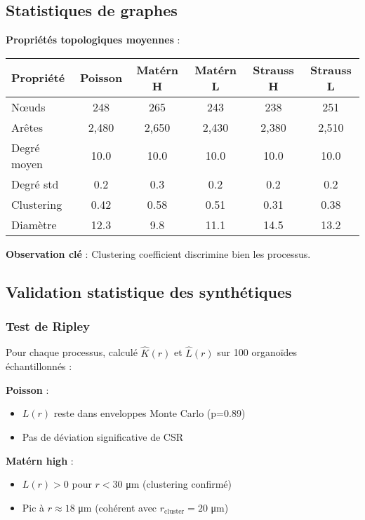 \subsection{Statistiques de graphes}

\textbf{Propriétés topologiques moyennes} :

\begin{tabular}{lccccc}
\hline
Propriété & Poisson & Matérn H & Matérn L & Strauss H & Strauss L \\
\hline
Nœuds & 248 & 265 & 243 & 238 & 251 \\
Arêtes & 2,480 & 2,650 & 2,430 & 2,380 & 2,510 \\
Degré moyen & 10.0 & 10.0 & 10.0 & 10.0 & 10.0 \\
Degré std & 0.2 & 0.3 & 0.2 & 0.2 & 0.2 \\
Clustering & 0.42 & 0.58 & 0.51 & 0.31 & 0.38 \\
Diamètre & 12.3 & 9.8 & 11.1 & 14.5 & 13.2 \\
\hline
\end{tabular}

\textbf{Observation clé} : Clustering coefficient discrimine bien les processus.

\subsection{Validation statistique des synthétiques}

\subsubsection{Test de Ripley}

Pour chaque processus, calculé $\hat{K}(r)$ et $\hat{L}(r)$ sur 100 organoïdes échantillonnés :

\textbf{Poisson} :
\begin{itemize}
    \item $L(r)$ reste dans enveloppes Monte Carlo (p=0.89)
    \item Pas de déviation significative de CSR
\end{itemize}

\textbf{Matérn high} :
\begin{itemize}
    \item $L(r) > 0$ pour $r < 30$ μm (clustering confirmé)
    \item Pic à $r \approx 18$ μm (cohérent avec $r_{\text{cluster}} = 20$ μm)
\end{itemize}


